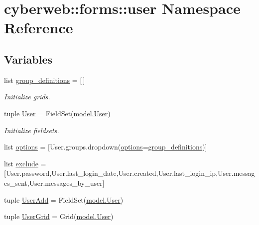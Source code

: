 \hypertarget{namespacecyberweb_1_1forms_1_1user}{\section{cyberweb\-:\-:forms\-:\-:user \-Namespace \-Reference}
\label{namespacecyberweb_1_1forms_1_1user}
}
\subsection*{\-Variables}
\begin{DoxyCompactItemize}
\item 
list \hyperlink{namespacecyberweb_1_1forms_1_1user_a370ad090228ed5c8791a370b00f0c19c}{group\-\_\-definitions} = \mbox{[}$\,$\mbox{]}
\begin{DoxyCompactList}\small\item\em \-Initialize grids. \end{DoxyCompactList}\item 
tuple \hyperlink{namespacecyberweb_1_1forms_1_1user_af019239159c43103d39de5007e4585db}{\-User} = \-Field\-Set(\hyperlink{classcyberweb_1_1model_1_1user_1_1_user}{model.\-User})
\begin{DoxyCompactList}\small\item\em \-Initialize fieldsets. \end{DoxyCompactList}\item 
list \hyperlink{namespacecyberweb_1_1forms_1_1user_ac211fce8aaab8d14e4c7cd5fa472038e}{options} = \mbox{[}\-User.\-groups.\-dropdown(\hyperlink{namespacecyberweb_1_1forms_1_1user_ac211fce8aaab8d14e4c7cd5fa472038e}{options}=\hyperlink{namespacecyberweb_1_1forms_1_1user_a370ad090228ed5c8791a370b00f0c19c}{group\-\_\-definitions})\mbox{]}
\item 
list \hyperlink{namespacecyberweb_1_1forms_1_1user_a5a84ecad1a825ba16b1dc22d2aa63909}{exclude} = \mbox{[}\-User.\-password,\-User.\-last\-\_\-login\-\_\-date,\-User.\-created,\-User.\-last\-\_\-login\-\_\-ip,\-User.\-messages\-\_\-sent,\-User.\-messages\-\_\-by\-\_\-user\mbox{]}
\item 
tuple \hyperlink{namespacecyberweb_1_1forms_1_1user_a329342398b686717cbd55a6af7c49883}{\-User\-Add} = \-Field\-Set(\hyperlink{classcyberweb_1_1model_1_1user_1_1_user}{model.\-User})
\item 
tuple \hyperlink{namespacecyberweb_1_1forms_1_1user_ab34e85b7ea9b664ef17120f7782e97bb}{\-User\-Grid} = \-Grid(\hyperlink{classcyberweb_1_1model_1_1user_1_1_user}{model.\-User})
\end{DoxyCompactItemize}


